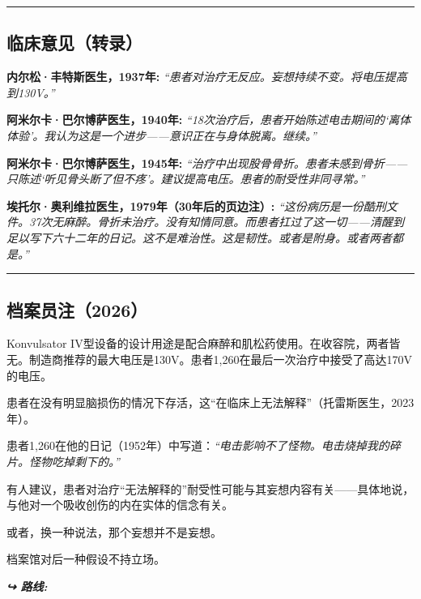 \vspace{0.5em}\noindent\rule{\textwidth}{0.5pt}\vspace{0.5em}

\subsection*{临床意见（转录）}

\noindent \textbf{内尔松·丰特斯医生，1937年:}
\textit{“患者对治疗无反应。妄想持续不变。将电压提高到130V。”}

\noindent \textbf{阿米尔卡·巴尔博萨医生，1940年:}
\textit{“18次治疗后，患者开始陈述电击期间的‘离体体验’。我认为这是一个进步——意识正在与身体脱离。继续。”}

\noindent \textbf{阿米尔卡·巴尔博萨医生，1945年:}
\textit{“治疗中出现股骨骨折。患者未感到骨折——只陈述‘听见骨头断了但不疼’。建议提高电压。患者的耐受性非同寻常。”}

\noindent \textbf{埃托尔·奥利维拉医生，1979年（30年后的页边注）:}
\textit{“这份病历是一份酷刑文件。37次无麻醉。骨折未治疗。没有知情同意。而患者扛过了这一切——清醒到足以写下六十二年的日记。这不是难治性。这是韧性。或者是附身。或者两者都是。”}

\vspace{0.5em}\noindent\rule{\textwidth}{0.5pt}\vspace{0.5em}

\subsection*{档案员注（2026）}

\noindent Konvulsator IV型设备的设计用途是配合麻醉和肌松药使用。在收容院，两者皆无。制造商推荐的最大电压是130V。患者1,260在最后一次治疗中接受了高达170V的电压。

\noindent 患者在没有明显脑损伤的情况下存活，这“在临床上无法解释”（托雷斯医生，2023年）。

\noindent 患者1,260在他的日记（1952年）中写道：\textit{“电击影响不了怪物。电击烧掉我的碎片。怪物吃掉剩下的。”}

\noindent 有人建议，患者对治疗“无法解释的”耐受性可能与其妄想内容有关——具体地说，与他对一个吸收创伤的内在实体的信念有关。

\noindent 或者，换一种说法，那个妄想并不是妄想。

\noindent 档案馆对后一种假设不持立场。

\vspace{0.5em}
\noindent\textit{\textbf{↪ 路线:}  \rotasep {} \rotasep {}}
